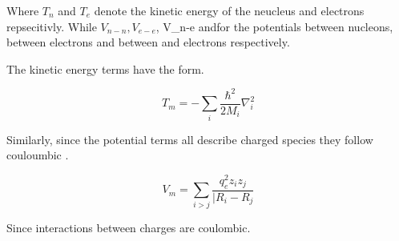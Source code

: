 Where $T_n$ and $T_e$ denote the kinetic energy of the neucleus and electrons repsecitivly. While $V_{n-n}, V_{e-e}$, V_{n-e} andfor the potentials between nucleons, between  electrons and between and electrons respectively.

The kinetic energy terms have the form.

\begin {equation}
T_m = - \sum_i \frac{\hbar^2}{2M_i} \nabla_i^2
\end {equation}

Similarly, since the potential terms all describe charged species they follow couloumbic .

\begin{equation}
	V_m = \sum_{i>j} \frac{q_e^2 z_i z_j }{|R_i-R_j}
\end{equation}

Since interactions between charges are coulombic. 
